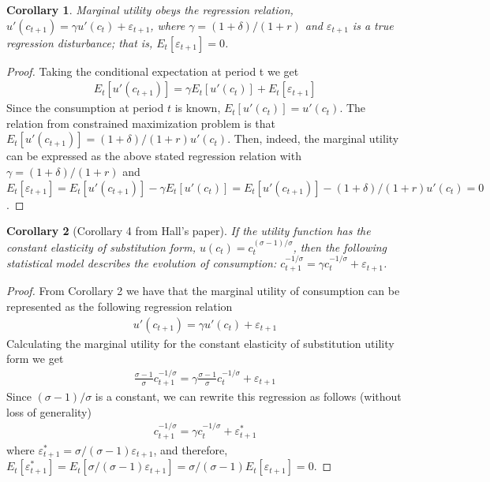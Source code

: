 \documentclass[11pt]{article}
\newtheorem*{corollary}{Corollary}
\begin{document}
\begin{enumerate}
\begin{corollary}
Marginal utility obeys the regression relation, $u'(c_{t+1}) = \gamma u'(c_t) + \varepsilon_{t+1}$, where $\gamma = (1+\delta)/(1+r)$ and $\varepsilon_{t+1}$ is a true regression disturbance; that is, $E_t [\varepsilon_{t+1}] = 0$.
\end{corollary}

\begin{proof}
Taking the conditional expectation at period t we get
\begin{align*}
     E_t [u'(c_{t+1})] =  \gamma E_t [u'(c_t)] + E_t[\varepsilon_{t+1}]
\end{align*}
Since the consumption at period $t$ is known, $E_t [u'(c_t)] = u'(c_t)$. The relation from constrained maximization problem is that $E_t [u'(c_{t+1})] =  (1+\delta)/(1+r) u'(c_t)$. Then, indeed, the marginal utility can be expressed as the above stated regression relation with $\gamma = (1+\delta)/(1+r)$ and $E_t[\varepsilon_{t+1}] = E_t [u'(c_{t+1})] -  \gamma E_t [u'(c_t)] = E_t [u'(c_{t+1})] - (1+\delta)/(1+r) u'(c_t)=0$.
\end{proof}

\begin{corollary}[Corollary 4 from Hall's paper]
If the utility function has the constant elasticity of substitution form, $u(c_t) = c_t^{(\sigma-1)/\sigma}$, then the following statistical model describes the evolution of consumption: $c_{t+1}^{-1/\sigma} = \gamma c_t^{-1/\sigma} + \varepsilon_{t+1}$.
\end{corollary}

\begin{proof}
From Corollary 2 we have that the marginal utility of consumption can be represented as the following regression relation
\begin{align*}
    u'(c_{t+1}) = \gamma u'(c_t) + \varepsilon_{t+1}
\end{align*}
Calculating the marginal utility for the constant elasticity of substitution utility form we get
\begin{align*}
    \frac{\sigma-1}{\sigma} c_{t+1}^{-1/\sigma} = \gamma \frac{\sigma-1}{\sigma} c_t^{-1/\sigma} + \varepsilon_{t+1}
\end{align*}
Since $(\sigma-1)/\sigma$ is a constant, we can rewrite this regression as follows (without loss of generality)
\begin{align*}
    c_{t+1}^{-1/\sigma} = \gamma c_t^{-1/\sigma} + \varepsilon_{t+1}^*
\end{align*}
where $\varepsilon_{t+1}^* = \sigma/(\sigma-1) \varepsilon_{t+1}$, and therefore, $E_t[\varepsilon_{t+1}^*] = E_t[\sigma/(\sigma-1) \varepsilon_{t+1}] = \sigma/(\sigma-1) E_t[\varepsilon_{t+1}] = 0$.
\end{proof}


\end{enumerate}
\end{document}
